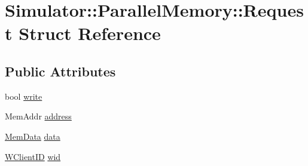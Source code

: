 \hypertarget{struct_simulator_1_1_parallel_memory_1_1_request}{\section{Simulator\+:\+:Parallel\+Memory\+:\+:Request Struct Reference}
\label{struct_simulator_1_1_parallel_memory_1_1_request}
}
\subsection*{Public Attributes}
\begin{DoxyCompactItemize}
\item 
bool \hyperlink{struct_simulator_1_1_parallel_memory_1_1_request_a00911f5856e9605735dd9cbc31eb7344}{write}
\item 
Mem\+Addr \hyperlink{struct_simulator_1_1_parallel_memory_1_1_request_a3c3900e2d259e06d035c6423cd97274a}{address}
\item 
\hyperlink{struct_simulator_1_1_mem_data}{Mem\+Data} \hyperlink{struct_simulator_1_1_parallel_memory_1_1_request_a65da7464a8bb003ac5e6a2a4cd2ed356}{data}
\item 
\hyperlink{namespace_simulator_a0de605c35951a450d074222efcef6359}{W\+Client\+I\+D} \hyperlink{struct_simulator_1_1_parallel_memory_1_1_request_a7f0a25f1a0dd3fbc64bfa8e77eb8bdac}{wid}
\end{DoxyCompactItemize}



